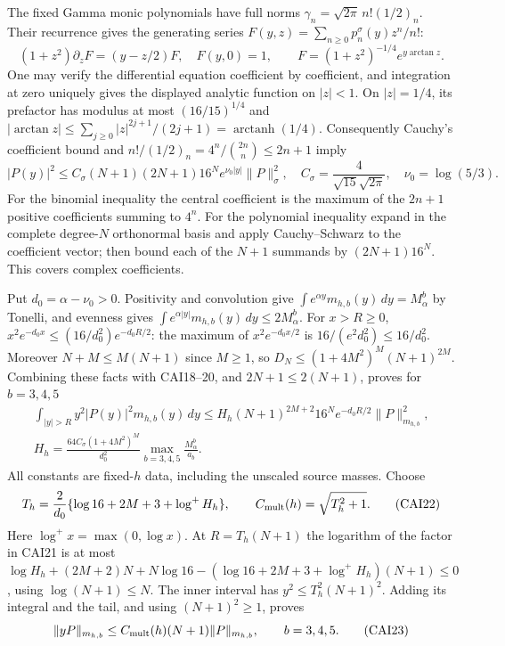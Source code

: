 The fixed Gamma monic polynomials have full norms
$\gamma_n=\sqrt{2\pi}\,n!(1/2)_n$. Their recurrence gives the
generating series $F(y,z)=\sum_{n\ge0}p_n^\sigma(y)z^n/n!$:
\[
 (1+z^2)\partial_zF=(y-z/2)F,\quad F(y,0)=1,\qquad
 F=(1+z^2)^{-1/4}e^{y\arctan z}.\tag{CAI19}
\]
One may verify the differential equation coefficient by coefficient,
and integration at zero uniquely gives the displayed analytic function
on $|z|<1$. On $|z|=1/4$, its prefactor has modulus at most
$(16/15)^{1/4}$ and
$|\arctan z|\le\sum_{j\ge0}|z|^{2j+1}/(2j+1)=\operatorname{arctanh}(1/4)$.
Consequently Cauchy's coefficient bound and
$n!/(1/2)_n=4^n/\binom{2n}{n}\le2n+1$ imply
\[
 |P(y)|^2\le C_\sigma(N+1)(2N+1)16^N e^{\nu_0|y|}\|P\|_\sigma^2,
 \quad C_\sigma=\frac4{\sqrt{15}\sqrt{2\pi}},\quad
 \nu_0=\log(5/3).\tag{CAI20}
\]
For the binomial inequality the central coefficient is the maximum of
the $2n+1$ positive coefficients summing to $4^n$. For the polynomial
inequality expand in the complete degree-$N$ orthonormal basis and
apply Cauchy--Schwarz to the coefficient vector; then bound each of
the $N+1$ summands by $(2N+1)16^N$. This covers complex coefficients.

Put $d_0=\alpha-\nu_0>0$. Positivity and convolution give
$\int e^{\alpha y}m_{h,b}(y)\,dy=M_\alpha^b$ by Tonelli, and evenness
gives $\int e^{\alpha|y|}m_{h,b}(y)\,dy\le2M_\alpha^b$.
For $x>R\ge0$,
$x^2e^{-d_0x}\le(16/d_0^2)e^{-d_0R/2}$: the maximum of
$x^2e^{-d_0x/2}$ is $16/(e^2d_0^2)\le16/d_0^2$.
Moreover $N+M\le M(N+1)$ since $M\ge1$, so
$D_N\le(1+4M^2)^M(N+1)^{2M}$. Combining these facts with CAI18--20,
and $2N+1\le2(N+1)$, proves for $b=3,4,5$
\[
 \begin{gathered}
 \int_{|y|>R}y^2|P(y)|^2m_{h,b}(y)\,dy
 \le H_h(N+1)^{2M+2}16^Ne^{-d_0R/2}\|P\|_{m_{h,b}}^2,
 \\ H_h=\frac{64C_\sigma(1+4M^2)^M}{d_0^2}
                          \max_{b=3,4,5}\frac{M_\alpha^b}{a_b}.
 \end{gathered}\tag{CAI21}
\]
All constants are fixed-$h$ data, including the unscaled source masses.
Choose
\[
 T_h=\frac2{d_0}\{\log16+2M+3+\log^+H_h\},\qquad
 C_{\rm mult}(h)=\sqrt{T_h^2+1}.\tag{CAI22}
\]
Here $\log^+x=\max(0,\log x)$. At $R=T_h(N+1)$ the logarithm of the
factor in CAI21 is at most
$\log H_h+(2M+2)N+N\log16-
(\log16+2M+3+\log^+H_h)(N+1)\le0$, using
$\log(N+1)\le N$. The inner interval has $y^2\le T_h^2(N+1)^2$.
Adding its integral and the tail, and using $(N+1)^2\ge1$, proves
\[
 \|yP\|_{m_{h,b}}\le C_{\rm mult}(h)(N+1)\|P\|_{m_{h,b}},
                         \qquad b=3,4,5.\tag{CAI23}
\]

